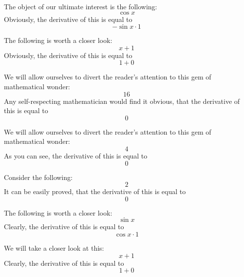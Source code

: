\documentclass{article}
\begin{document}
The object of our ultimate interest is the following:
\begin{equation}
\cos x 
\end{equation}
Obviously, the derivative of this is equal to
\begin{equation}
-\sin x \cdot 1 
\end{equation}

The following is worth a closer look:
\begin{equation}
x + 1 
\end{equation}
Obviously, the derivative of this is equal to
\begin{equation}
1 + 0 
\end{equation}

We will allow ourselves to divert the reader's attention to this gem of mathematical wonder:
\begin{equation}
16 
\end{equation}
Any self-respecting mathematician would find it obvious, that the derivative of this is equal to
\begin{equation}
0 
\end{equation}

We will allow ourselves to divert the reader's attention to this gem of mathematical wonder:
\begin{equation}
4 
\end{equation}
As you can see, the derivative of this is equal to
\begin{equation}
0 
\end{equation}

Consider the following:
\begin{equation}
2 
\end{equation}
It can be easily proved, that the derivative of this is equal to
\begin{equation}
0 
\end{equation}

The following is worth a closer look:
\begin{equation}
\sin x 
\end{equation}
Clearly, the derivative of this is equal to
\begin{equation}
\cos x \cdot 1 
\end{equation}

We will take a closer look at this:
\begin{equation}
x + 1 
\end{equation}
Clearly, the derivative of this is equal to
\begin{equation}
1 + 0 
\end{equation}
\end{document}
